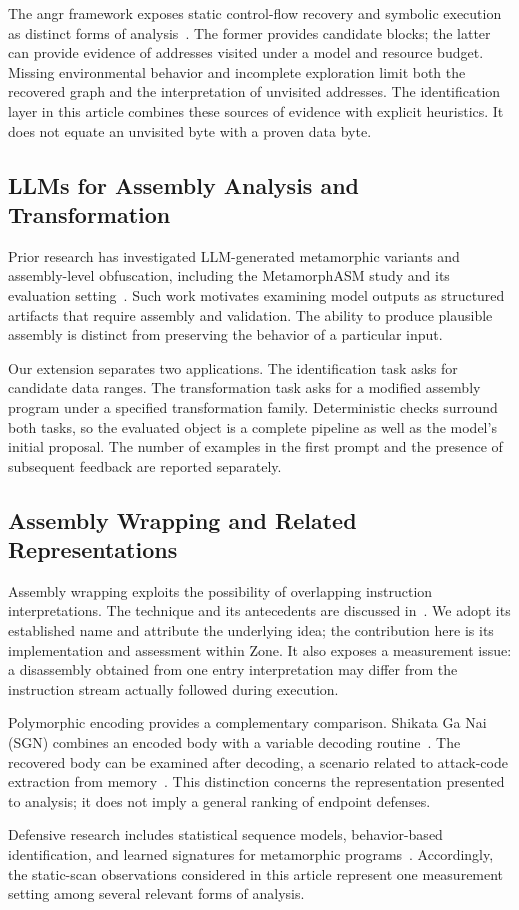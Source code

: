 The angr framework exposes static control-flow recovery and symbolic
execution as distinct forms of analysis~\cite{angr_cfg_docs}. The former
provides candidate blocks; the latter can provide evidence of addresses
visited under a model and resource budget. Missing environmental behavior
and incomplete exploration limit both the recovered graph and the
interpretation of unvisited addresses. The identification layer in this
article combines these sources of evidence with explicit heuristics.
It does not equate an unvisited byte with a proven data byte.

\subsection{LLMs for Assembly Analysis and Transformation}
Prior research has investigated LLM-generated metamorphic variants and
assembly-level obfuscation, including the MetamorphASM study and its
evaluation setting~\cite{llm2,llmobf}. Such work motivates examining model
outputs as structured artifacts that require assembly and validation.
The ability to produce plausible assembly is distinct from preserving
the behavior of a particular input.

Our extension separates two applications. The identification task asks
for candidate data ranges. The transformation task asks for a modified
assembly program under a specified transformation family. Deterministic
checks surround both tasks, so the evaluated object is a complete
pipeline as well as the model's initial proposal. The number of examples
in the first prompt and the presence of subsequent feedback are reported
separately.

\subsection{Assembly Wrapping and Related Representations}
Assembly wrapping exploits the possibility of overlapping instruction
interpretations. The technique and its antecedents are discussed
in~\cite{assembly_wrapping}. We adopt its established name and attribute
the underlying idea; the contribution here is its implementation and
assessment within Zone. It also exposes a measurement issue: a
disassembly obtained from one entry interpretation may differ from the
instruction stream actually followed during execution.

Polymorphic encoding provides a complementary comparison. Shikata Ga Nai
(SGN) combines an encoded body with a variable decoding
routine~\cite{sgnarticle,sgn64,sgnstrong}. The recovered body can be
examined after decoding, a scenario related to attack-code extraction
from memory~\cite{codeExtraction}. This distinction concerns the
representation presented to analysis; it does not imply a general
ranking of endpoint defenses.

Defensive research includes statistical sequence models, behavior-based
identification, and learned signatures for metamorphic
programs~\cite{wong2006hunting,identifyingmeth,methgenetic,metamorphic1}.
Accordingly, the static-scan observations considered in this article
represent one measurement setting among several relevant forms of
analysis.

